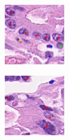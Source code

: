 \begin{figure}[h]
	\centering
	\begin{subfigure}{0.3\textwidth}
		\includegraphics[width=\linewidth]{images/nuclei_example_1.png}
	\end{subfigure}
	\begin{subfigure}{0.3\textwidth}
		\includegraphics[width=\linewidth]{images/nuclei_example_2.png}

\end{subfigure}
\end{figure}
